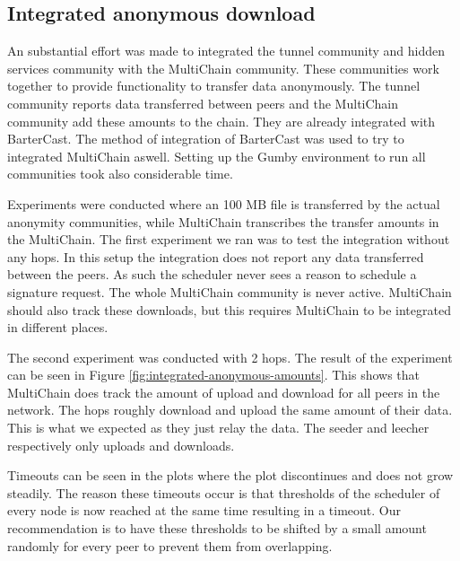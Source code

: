 \subsection{Integrated anonymous download}
An substantial effort was made to integrated the tunnel community and hidden services community with the MultiChain community.
These communities work together to provide functionality to transfer data anonymously.
The tunnel community reports data transferred between peers and the MultiChain community add these amounts to the chain.
They are already integrated with BarterCast.
The method of integration of BarterCast was used to try to integrated MultiChain aswell.
Setting up the Gumby environment to run all communities took also considerable time.

Experiments were conducted where an 100 MB file is transferred by the actual anonymity communities,
while MultiChain transcribes the transfer amounts in the MultiChain.
The first experiment we ran was to test the integration without any hops.
In this setup the integration does not report any data transferred between the peers.
As such the scheduler never sees a reason to schedule a signature request.
The whole MultiChain community is never active.
MultiChain should also track these downloads,
but this requires MultiChain to be integrated in different places.

The second experiment was conducted with 2 hops.
The result of the experiment can be seen in Figure \ref{fig:integrated-anonymous-amounts}.
This shows that MultiChain does track the amount of upload and download for all peers in the network.
The hops roughly download and upload the same amount of their data.
This is what we expected as they just relay the data.
The seeder and leecher respectively only uploads and downloads.

Timeouts can be seen in the plots where the plot discontinues and does not grow steadily.
The reason these timeouts occur is that thresholds of the scheduler of every node is now reached at the same time resulting in a timeout.
Our recommendation is to have these thresholds to be shifted by a small amount randomly for every peer
to prevent them from overlapping.


